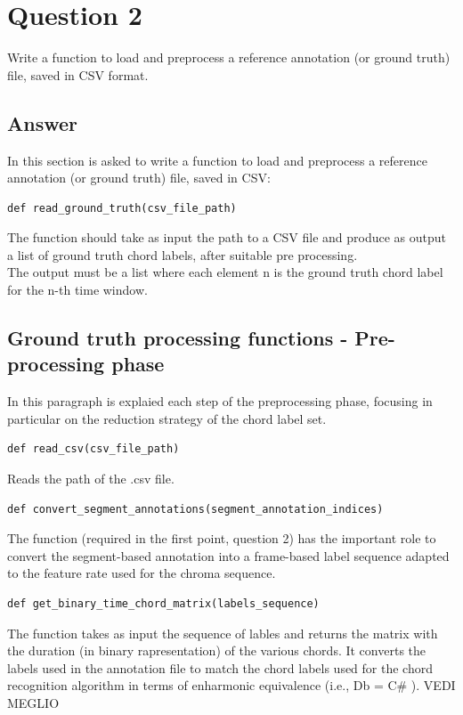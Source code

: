\documentclass[
	12pt, %
]{fphw}
\begin{document}

\section*{Question 2}

\begin{problem}
	Write a function to load and preprocess a reference annotation (or ground truth) file, saved in CSV
format.
\end{problem}

\subsection*{Answer}

In this section is asked to write a function to load and preprocess a reference annotation (or ground truth) file, saved in CSV:\\

\begin{lstlisting}
def read_ground_truth(csv_file_path)
\end{lstlisting}


The function should take as input the path to a CSV file and produce as output a list of ground truth chord labels, after suitable pre processing.\\
The output must be a list where each element
n is the ground truth chord label for the n-th time window.

\subsection{Ground truth processing functions - Pre-processing phase}
In this paragraph is explaied each step of the preprocessing phase, focusing in particular on the reduction strategy of the chord label set.
\begin{lstlisting}
def read_csv(csv_file_path)
\end{lstlisting}
Reads the path of the .csv file.
\begin{lstlisting}
def convert_segment_annotations(segment_annotation_indices)
\end{lstlisting}
The function (required in the first point, question 2) has the important role to convert the segment-based annotation into a frame-based label sequence adapted to the feature rate used for the chroma sequence.\\

\begin{lstlisting}
def get_binary_time_chord_matrix(labels_sequence)
\end{lstlisting}
The function takes as input the sequence of lables and returns the matrix with the duration (in binary rapresentation) of the various chords. It converts the labels used in the annotation file to match the chord labels used for the chord recognition
algorithm in terms of enharmonic equivalence (i.e., Db = C\# ).
VEDI MEGLIO
\end{document}
